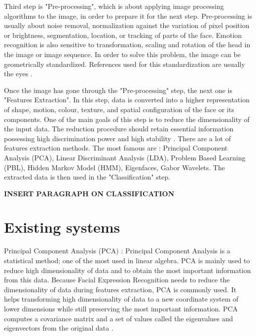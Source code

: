 \noindent Third step is "Pre-processing", which is about applying image processing algorithms to the image, in order to prepare it for the next step. Pre-processing is usually about noise removal, normalization against the variation of pixel position or brightness, segmentation, location, or tracking of parts of the face. Emotion recognition is also sensitive to transformation, scaling and rotation of the head in the image or image sequence. In order to solve this problem, the image can be geometrically standardized. References used for this standardization are usually the eyes \cite{CHI03}.
\newline

\noindent Once the image has gone through the "Pre-processing" step, the next one is "Features Extraction". In this step, data is converted into a higher representation of shape, motion, colour, texture, and spatial configuration of the face or its components. One of the main goals of this step is to reduce the dimensionality of the input data. The reduction procedure should retain essential information possessing high discrimination power and high stability \cite{CHI03}. There are a lot of features extraction methods. The most famous are : Principal Component Analysis (PCA), Linear Discriminant Analysis (LDA), Problem Based Learning (PBL), Hidden Markov Model (HMM), Eigenfaces, Gabor Wavelets. The extracted data is then used in the "Classification" step.
\newline

\noindent
\textbf{\color{red} INSERT PARAGRAPH ON CLASSIFICATION}

\section{Existing systems}

\noindent Principal Component Analysis (PCA) : Principal Component Analysis is a statistical method; one of the most used in linear algebra. PCA is mainly used to reduce high dimensionality of data and to obtain the most important information from this data. Because Facial Expression Recognition needs to reduce the dimensionality of data during features extraction, PCA is commonly used. It helps transforming high dimensionality of data to a new coordinate system of lower dimensions while still preserving the most important information. PCA computes a covariance matrix and a set of values called the eigenvalues and eigenvectors from the original data \cite{GAN08}.
\newline


